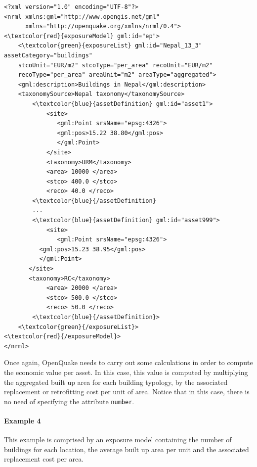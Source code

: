 \begin{Verbatim}[frame=single, commandchars=\\\{\}, samepage=false]
<?xml version="1.0" encoding="UTF-8"?>
<nrml xmlns:gml="http://www.opengis.net/gml"
      xmlns="http://openquake.org/xmlns/nrml/0.4">
<\textcolor{red}{exposureModel} gml:id="ep">
    <\textcolor{green}{exposureList} gml:id="Nepal_13_3" assetCategory="buildings" 
    stcoUnit="EUR/m2" stcoType="per_area" recoUnit="EUR/m2" 
    recoType="per_area" areaUnit="m2" areaType="aggregated">
    <gml:description>Buildings in Nepal</gml:description>
    <taxonomySource>Nepal taxonomy</taxonomySource>
        <\textcolor{blue}{assetDefinition} gml:id="asset1">
            <site>
               <gml:Point srsName="epsg:4326">
               <gml:pos>15.22 38.80</gml:pos>
               </gml:Point>
            </site>
            <taxonomy>URM</taxonomy>
            <area> 10000 </area>
            <stco> 400.0 </stco>
            <reco> 40.0 </reco>
        <\textcolor{blue}{/assetDefinition} 
        ...
        <\textcolor{blue}{assetDefinition} gml:id="asset999">
            <site>
               <gml:Point srsName="epsg:4326">
	      <gml:pos>15.23 38.95</gml:pos>
	      </gml:Point>
	   </site>
	   <taxonomy>RC</taxonomy>
            <area> 20000 </area>
            <stco> 500.0 </stco>
            <reco> 50.0 </reco>
        <\textcolor{blue}{/assetDefinition}> 
    <\textcolor{green}{/exposureList}>
<\textcolor{red}{/exposureModel}>
</nrml>
\end{Verbatim}

Once again, OpenQuake needs to carry out some calculations in order to compute the economic value per asset. In this case, this value is computed by multiplying the aggregated built up area for each building typology, by the associated replacement or retrofitting cost per unit of area. Notice that in this case, there is no need of specifying the attribute \Verb+number+.

 \paragraph{Example 4}
This example is comprised by an exposure model containing the number of buildings for each location, the average built up area per unit and the associated replacement cost per area. 

